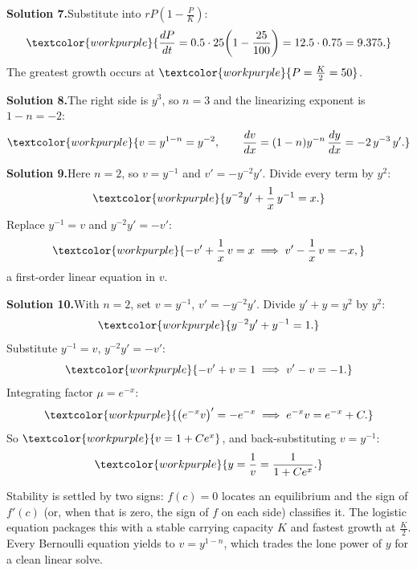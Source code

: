\medskip
\noindent\textbf{Solution 7.}\quad Substitute into $rP\!\left(1-\frac{P}{K}\right)$:
\[ \textcolor{workpurple}{\frac{dP}{dt} = 0.5 \cdot 25\!\left(1 - \frac{25}{100}\right) = 12.5 \cdot 0.75 = 9.375.} \]
The greatest growth occurs at
$\textcolor{workpurple}{P = \frac{K}{2} = 50}$.

\medskip
\noindent\textbf{Solution 8.}\quad The right side is $y^{3}$, so $n = 3$ and the
linearizing exponent is $1 - n = -2$:
\[ \textcolor{workpurple}{v = y^{1-n} = y^{-2}, \qquad \frac{dv}{dx} = (1-n)y^{-n}\,\frac{dy}{dx} = -2\,y^{-3}\,y'.} \]

\medskip
\noindent\textbf{Solution 9.}\quad Here $n = 2$, so $v = y^{-1}$ and
$v' = -y^{-2}y'$. Divide every term by $y^{2}$:
\[ \textcolor{workpurple}{y^{-2}y' + \frac{1}{x}\,y^{-1} = x.} \]
Replace $y^{-1} = v$ and $y^{-2}y' = -v'$:
\[ \textcolor{workpurple}{-v' + \frac{1}{x}\,v = x \;\Longrightarrow\; v' - \frac{1}{x}\,v = -x,} \]
a first-order linear equation in $v$.

\medskip
\noindent\textbf{Solution 10.}\quad With $n = 2$, set $v = y^{-1}$,
$v' = -y^{-2}y'$. Divide $y' + y = y^{2}$ by $y^{2}$:
\[ \textcolor{workpurple}{y^{-2}y' + y^{-1} = 1.} \]
Substitute $y^{-1} = v$, $y^{-2}y' = -v'$:
\[ \textcolor{workpurple}{-v' + v = 1 \;\Longrightarrow\; v' - v = -1.} \]
Integrating factor $\mu = e^{-x}$:
\[ \textcolor{workpurple}{\left(e^{-x}v\right)' = -e^{-x} \;\Longrightarrow\; e^{-x}v = e^{-x} + C.} \]
So $\textcolor{workpurple}{v = 1 + Ce^{x}}$, and back-substituting $v = y^{-1}$:
\[ \textcolor{workpurple}{y = \frac{1}{v} = \frac{1}{1 + Ce^{x}}.} \]

\vspace{0.8em}
\begin{conceptbox}
Stability is settled by two signs: \textcolor{accentorange}{$f(c)=0$} locates an
equilibrium and \textcolor{accentorange}{the sign of $f'(c)$} (or, when that is
zero, the sign of $f$ on each side) classifies it. The
\textcolor{accentorange}{logistic equation} packages this with a stable carrying
capacity $K$ and fastest growth at $\tfrac{K}{2}$. Every Bernoulli equation
yields to \textcolor{accentorange}{$v = y^{1-n}$}, which trades the lone power of
$y$ for a clean linear solve.
\end{conceptbox}



